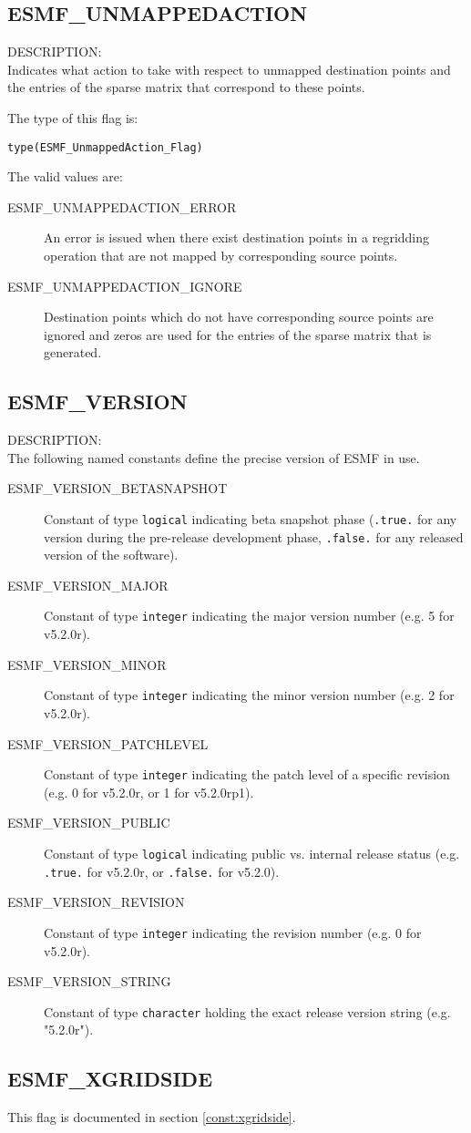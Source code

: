 \subsection{ESMF\_UNMAPPEDACTION}
\label{const:unmappedaction}
{\sf DESCRIPTION:\\}
Indicates what action to take with respect to unmapped destination points
and the entries of the sparse matrix that correspond to these points.

The type of this flag is:

{\tt type(ESMF\_UnmappedAction\_Flag)}

The valid values are:
\begin{description}
	\item[ESMF\_UNMAPPEDACTION\_ERROR]
	An error is issued when there exist destination points in a regridding
	operation that are not mapped by corresponding source points.
	\item[ESMF\_UNMAPPEDACTION\_IGNORE]
	Destination points which do not have corresponding source points are 
	ignored and zeros are used for the entries of the sparse matrix
	that is generated.
\end{description}

\subsection{ESMF\_VERSION}
\label{const:version}

{\sf DESCRIPTION:\\}
The following named constants define the precise version of ESMF in use.

\begin{description}
\item [ESMF\_VERSION\_BETASNAPSHOT]
      Constant of type {\tt logical} indicating beta snapshot phase
      ({\tt .true.} for any version during the pre-release development phase,
      {\tt .false.} for any released version of the software).
\item [ESMF\_VERSION\_MAJOR]
      Constant of type {\tt integer} indicating the major version number
      (e.g. 5 for v5.2.0r).
\item [ESMF\_VERSION\_MINOR]
      Constant of type {\tt integer} indicating the minor version number
      (e.g. 2 for v5.2.0r).
\item [ESMF\_VERSION\_PATCHLEVEL]
      Constant of type {\tt integer} indicating the patch level of a specific
      revision (e.g. 0 for v5.2.0r, or 1 for v5.2.0rp1).
\item [ESMF\_VERSION\_PUBLIC]
      Constant of type {\tt logical} indicating public vs. internal release
      status (e.g. {\tt .true.} for v5.2.0r, or {\tt .false.} for v5.2.0).
\item [ESMF\_VERSION\_REVISION]
      Constant of type {\tt integer} indicating the revision number
      (e.g. 0 for v5.2.0r).
\item [ESMF\_VERSION\_STRING]
      Constant of type {\tt character} holding the exact release version string
      (e.g. "5.2.0r").
\end{description}

\subsection{ESMF\_XGRIDSIDE}
This flag is documented in section \ref{const:xgridside}.
